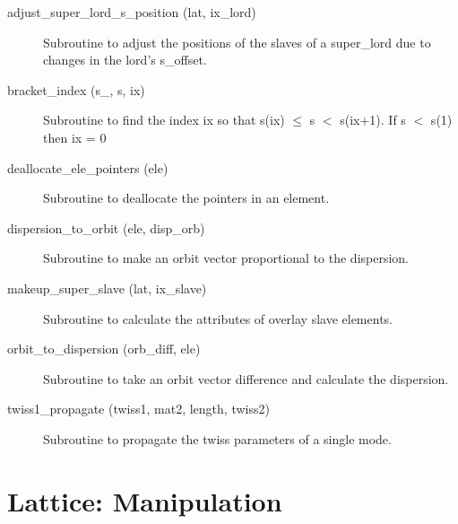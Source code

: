 \begin{description}

\label{r:adjust.super.lord.s.position}
\item[adjust_super_lord_s_position (lat, ix_lord)] \Newline
Subroutine to adjust the positions of the slaves of a 
super_lord due to changes in the lord's s_offset. 

\label{r:bracket.index}
\item[bracket_index (s_, s, ix)] \Newline
Subroutine to find the index ix so that s(ix) $\le$ s $<$ s(ix+1). 
If s $<$ s(1) then ix = 0 

\label{r:deallocate.ele.pointers}
\item[deallocate_ele_pointers (ele)] \Newline
Subroutine to deallocate the pointers in an element. 

\label{r:dispersion.to.orbit}
\item[dispersion_to_orbit (ele, disp_orb)] \Newline
Subroutine to make an orbit vector proportional to the dispersion. 

\label{r:makeup.super.slave}
\item[makeup_super_slave (lat, ix_slave)] \Newline
Subroutine to calculate the attributes of overlay slave elements. 

\label{r:orbit.to.dispersion}
\item[orbit_to_dispersion (orb_diff, ele)] \Newline
Subroutine to take an orbit vector difference and calculate the dispersion. 

\label{r:twiss1.propagate}
\item[twiss1_propagate (twiss1, mat2, length, twiss2)] \Newline 
Subroutine to propagate the twiss parameters of a single mode.

\end{description}

\section{Lattice: Manipulation}
\label{r:trans}    

